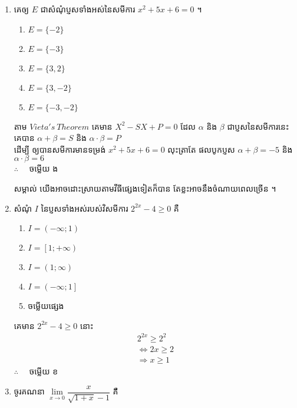 \documentclass[a4paper,12pt]{article}
\begin{document}
\maketitle
\begin{enumerate}[m]
	\item គេឲ្យ $E$ ជាសំណុំប្ញសទាំងអស់នៃសមីការ $x^2+5x+6=0$ ។
		\begin{enumerate}[k,5]
			\item $E=\lbrace-2\rbrace$
			\item $E=\lbrace-3\rbrace$
			\item $E=\lbrace3,2\rbrace$
			\item $E=\lbrace3,-2\rbrace$
			\item $E=\lbrace-3,-2\rbrace$
		\end{enumerate}
	\answer
	\begin{center}
		តាម  $Vieta's~Theorem$ គេមាន $X^2-SX+P=0$ ដែល $\alpha$ និង $\beta$ ជាប្ញសនៃសមីការនេះ គេបាន $\alpha+\beta=S$ និង $\alpha\cdot\beta=P$ \\
		ដើម្បី ឲ្យបានសមីការមានទម្រង់ $x^2+5x+6=0$ លុះត្រាតែ ផលបូកប្ញស $\alpha+\beta=-5$ និង $\alpha\cdot\beta=6$\\
		$\therefore \quad$ \kml ចម្លើយ \kbk ង
	\end{center}
		\kml សម្គាល់ \kb យើងអាចដោះស្រាយតាមវីធីផ្សេងទៀតក៏បាន តែខ្លះអាចនឹងចំណាយពេលច្រើន ។\\
	{\color{blue}\hrulefill}
	\item សំណុំ $I$ នៃប្ញសទាំងអស់របស់វិសមីការ $2^{2x}-4\ge0$ គឺ
	\begin{enumerate}[k,3]
		\item $I=\left(-\infty;1\right)$
		\item $I=\left[1;+\infty\right)$
		\item $I=\left(1;\infty\right)$
		\item $I=\left(-\infty;1\right]$
		\item ចម្លើយផ្សេង
	\end{enumerate}
	\answer
	\begin{center}
		គេមាន $2^{2x}-4\ge0$ នោះ
		\begin{align*}
			2^{2x} \ge 2^{2}\\
			\Leftrightarrow 2x \ge 2\\
			\Rightarrow x\ge1
		\end{align*}
		$\therefore \quad$ \kml ចម្លើយ \kbk ខ
	\end{center}
	{\color{blue}\hrulefill}
	\item ចូរគណនា $\lim\limits_{x\to0}\dfrac{x}{\sqrt{1+x}-1}$ គឺ

\end{enumerate}
\end{document}
